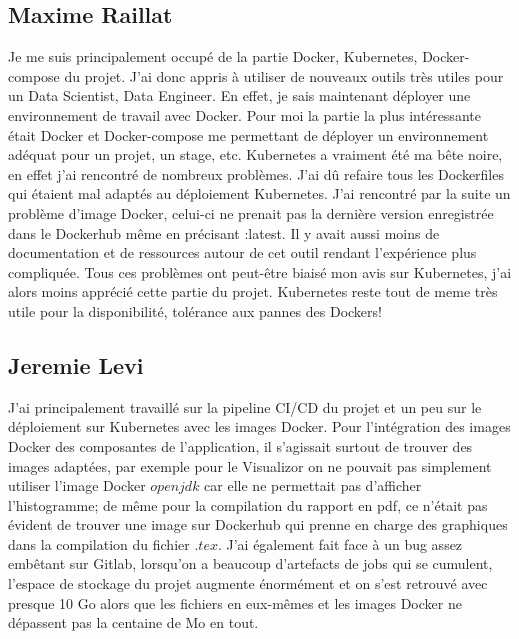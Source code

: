 \documentclass{article}
\begin{document}
\subsection{Maxime Raillat}
Je me suis principalement occupé de la partie Docker, Kubernetes, Docker-compose du projet. J'ai donc appris à utiliser de nouveaux outils très utiles pour un Data Scientist, Data Engineer. En effet, je sais maintenant déployer une environnement de travail avec Docker. Pour moi la partie la plus intéressante était Docker et Docker-compose me permettant de déployer un environnement adéquat pour un projet, un stage, etc. Kubernetes a vraiment été ma bête noire, en effet j'ai rencontré de nombreux problèmes. J'ai dû refaire tous les Dockerfiles qui étaient mal adaptés au déploiement Kubernetes. J'ai rencontré par la suite un problème d'image Docker, celui-ci ne prenait pas la dernière version enregistrée dans le Dockerhub même en précisant :latest. Il y avait aussi moins de documentation et de ressources autour de cet outil rendant l'expérience plus compliquée. Tous ces problèmes ont peut-être biaisé mon avis sur Kubernetes, j'ai alors moins apprécié cette partie du projet. Kubernetes reste tout de meme très utile pour la disponibilité, tolérance aux pannes des Dockers!

\subsection{Jeremie Levi}
J'ai principalement travaillé sur la pipeline CI/CD du projet et un peu sur le déploiement sur Kubernetes avec les images Docker. Pour l'intégration des images Docker des composantes de l'application, il s'agissait surtout de trouver des images adaptées, par exemple pour le Visualizor on ne pouvait pas simplement utiliser l'image Docker $openjdk$ car elle ne permettait pas d'afficher l'histogramme; de même pour la compilation du rapport en pdf, ce n'était pas évident de trouver une image sur Dockerhub qui prenne en charge des graphiques dans la compilation du fichier $.tex$. J'ai également fait face à un bug assez embêtant sur Gitlab, lorsqu'on a beaucoup d'artefacts de jobs qui se cumulent, l'espace de stockage du projet augmente énormément et on s'est retrouvé avec presque 10 Go alors que les fichiers en eux-mêmes et les images Docker ne dépassent pas la centaine de Mo en tout.
\end{document}
